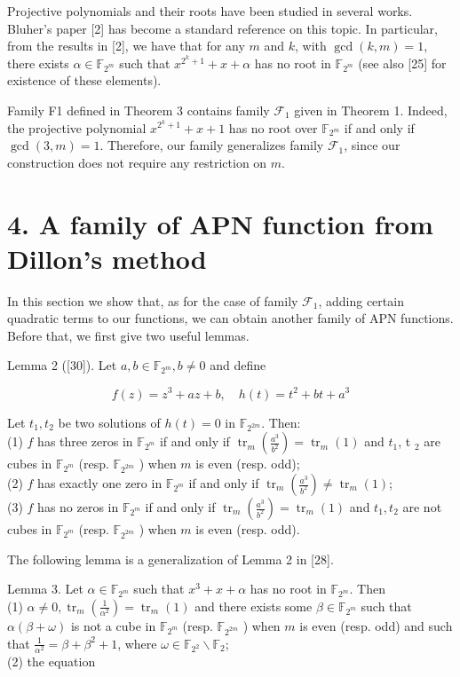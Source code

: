 \documentclass[10pt]{article}
\begin{document}
Projective polynomials and their roots have been studied in several works. Bluher's paper [2] has become a standard reference on this topic. In particular, from the results in [2], we have that for any $m$ and $k$, with $\operatorname{gcd}(k, m)=1$, there exists $\alpha \in \mathbb{F}_{2^{m}}$ such that $x^{2^{k}+1}+x+\alpha$ has no root in $\mathbb{F}_{2^{m}}$ (see also [25] for existence of these elements).

Family F1 defined in Theorem 3 contains family $\mathcal{F}_{1}$ given in Theorem 1. Indeed, the projective polynomial $x^{2^{k}+1}+x+1$ has no root over $\mathbb{F}_{2^{m}}$ if and only if $\operatorname{gcd}(3, m)=1$. Therefore, our family generalizes family $\mathcal{F}_{1}$, since our construction does not require any restriction on $m$.

\section*{4. A family of APN function from Dillon's method}
In this section we show that, as for the case of family $\mathcal{F}_{1}$, adding certain quadratic terms to our functions, we can obtain another family of APN functions. Before that, we first give two useful lemmas.

Lemma 2 ([30]). Let $a, b \in \mathbb{F}_{2^{m}}, b \neq 0$ and define

$$
f(z)=z^{3}+a z+b, \quad h(t)=t^{2}+b t+a^{3}
$$

Let $t_{1}, t_{2}$ be two solutions of $h(t)=0$ in $\mathbb{F}_{2^{2 m}}$. Then:\\
(1) $f$ has three zeros in $\mathbb{F}_{2^{m}}$ if and only if $\operatorname{tr}_{m}\left(\frac{a^{3}}{b^{2}}\right)=\operatorname{tr}_{m}(1)$ and $t_{1}$, t ${ }_{2}$ are cubes in $\mathbb{F}_{2^{m}}$ (resp. $\mathbb{F}_{2^{2 m}}$ ) when $m$ is even (resp. odd);\\
(2) $f$ has exactly one zero in $\mathbb{F}_{2^{m}}$ if and only if $\operatorname{tr}_{m}\left(\frac{a^{3}}{b^{2}}\right) \neq \operatorname{tr}_{m}(1)$;\\
(3) $f$ has no zeros in $\mathbb{F}_{2^{m}}$ if and only if $\operatorname{tr}_{m}\left(\frac{a^{3}}{b^{2}}\right)=\operatorname{tr}_{m}(1)$ and $t_{1}, t_{2}$ are not cubes in $\mathbb{F}_{2^{m}}$ (resp. $\mathbb{F}_{2^{2 m}}$ ) when $m$ is even (resp. odd).

The following lemma is a generalization of Lemma 2 in [28].

Lemma 3. Let $\alpha \in \mathbb{F}_{2^{m}}$ such that $x^{3}+x+\alpha$ has no root in $\mathbb{F}_{2^{m}}$. Then\\
(1) $\alpha \neq 0, \operatorname{tr}_{m}\left(\frac{1}{\alpha^{2}}\right)=\operatorname{tr}_{m}(1)$ and there exists some $\beta \in \mathbb{F}_{2^{m}}$ such that $\alpha(\beta+\omega)$ is not a cube in $\mathbb{F}_{2^{m}}$ (resp. $\mathbb{F}_{2^{2 m}}$ ) when $m$ is even (resp. odd) and such that $\frac{1}{\alpha^{2}}=\beta+\beta^{2}+1$, where $\omega \in \mathbb{F}_{2^{2}} \backslash \mathbb{F}_{2}$;\\
(2) the equation
\end{document}
